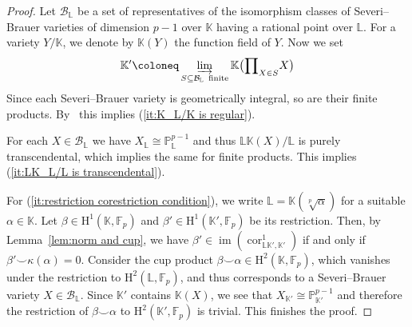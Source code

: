 \documentclass{amsart}
\theoremstyle{definition}
\theoremstyle{remark}
\DeclareMathOperator{\im}{im}
\DeclareMathOperator{\cores}{cor}
\newcommand{\KK}{\mathbb{K}}
\newcommand{\LL}{\mathbb{L}}
\newcommand{\FF}{\mathbb{F}}
\newcommand{\rmH}{\mathrm H}%
\begin{document}
\begin{proof}
    Let $\mathcal{B}_\LL$ be a set of representatives of the isomorphism classes of Severi--Brauer varieties of dimension $p-1$ over $\KK$ having a rational point over $\LL$. For a variety $Y/\KK$, we denote by $\KK(Y)$ the function field of $Y$. Now we set
    \begin{align*}
        \KK'\coloneq  \varinjlim_{S\subseteq \mathcal{B}_\LL\,\text{ finite}}\KK\big({\prod}_{X\in S}X\big)
    \end{align*}
    Since each Severi--Brauer variety is geometrically integral, so are their finite products. By~\cite[Chapter 3, Cor. 2.14]{Liu2006} this implies (\ref{it:K_L/K is regular}). 

    For each $X\in \mathcal{B}_\LL$ we have $X_\LL\cong \mathbb{P}_{\LL}^{p-1}$ and thus $\LL\KK(X)/\LL$ is purely transcendental, which implies the same for finite products. This implies (\ref{it:LK_L/L is transcendental}).

    For (\ref{it:restriction corestriction condition}), we write $\LL=\KK(\sqrt[p]{\alpha})$ for a suitable $\alpha\in \KK$. Let $\beta\in \rmH^1(\KK,\FF_p)$ and $\beta'\in \rmH^1(\KK',\FF_p)$ be its restriction. Then, by Lemma~\ref{lem:norm and cup}, we have $\beta'\in \im(\cores^1_{\LL\KK',\KK'})$ if and only if $\beta'\smallsmile \kappa(\alpha)=0$. Consider the cup product $\beta\smallsmile \alpha\in \rmH^2(\KK,\FF_p)$, which vanishes under the restriction to $\rmH^2(\LL,\FF_p)$, and thus corresponds to a Severi--Brauer variety $X\in \mathcal{B}_\LL$. Since $\KK'$ contains $\KK(X)$, we see that $X_{\KK'}\cong \mathbb{P}^{p-1}_{\KK'}$ and therefore the restriction of $\beta\smallsmile\alpha$ to $\rmH^2(\KK',\FF_p)$ is trivial. This finishes the proof.
\end{proof}
\end{document}
